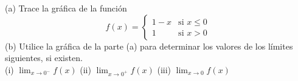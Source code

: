 \setcounter{enumi}{4}
\item (a) Trace la gráfica de la función
$$f(x) = \begin{cases} 1 - x & \text{si } x \le 0 \\ 1 & \text{si } x > 0 \end{cases}$$
(b) Utilice la gráfica de la parte (a) para determinar los valores de los límites siguientes, si existen.\\
(i) $\lim_{x \to 0^-} f(x)$ \quad (ii) $\lim_{x \to 0^+} f(x)$ \quad (iii) $\lim_{x \to 0} f(x)$
